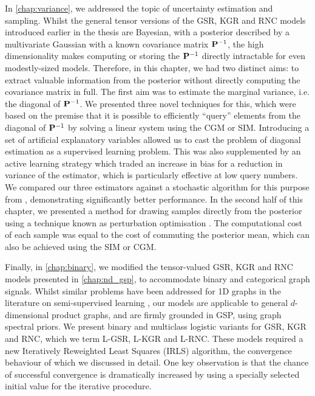 In \cref{chap:variance}, we addressed the topic of uncertainty estimation and sampling. Whilst the general tensor versions of the GSR, KGR and RNC models introduced earlier in the thesis are Bayesian, with a posterior described by a multivariate Gaussian with a known covariance matrix $\mathbf{P}^{-1}$, the high dimensionality makes computing or storing the $\mathbf{P}^{-1}$ directly intractable for even modestly-sized models. Therefore, in this chapter, we had two distinct aims: to extract valuable information from the posterior without directly computing the covariance matrix in full. The first aim was to estimate the marginal variance, i.e. the diagonal of $\mathbf{P}^{-1}$. We presented three novel techniques for this, which were based on the premise that it is possible to efficiently ``query'' elements from the diagonal of $\mathbf{P}^{-1}$ by solving a linear system using the CGM or SIM.  Introducing a set of artificial explanatory variables allowed us to cast the problem of diagonal estimation as a supervised learning problem. This was also supplemented by an active learning strategy which traded an increase in bias for a reduction in variance of the estimator, which is particularly effective at low query numbers. We compared our three estimators against a stochastic algorithm for this purpose from \cite{Bekas2007}, demonstrating significantly better performance. In the second half of this chapter, we presented a method for drawing samples directly from the posterior using a technique known as perturbation optimisation \citep{Orieux2012}. The computational cost of each sample was equal to the cost of commuting the posterior mean, which can also be achieved using the SIM or CGM. 

Finally, in \cref{chap:binary}, we modified the tensor-valued GSR, KGR and RNC models presented in \cref{chap:nd_gsp}, to accommodate binary and categorical graph signals. Whilst similar problems have been addressed for 1D graphs in the literature on semi-supervised learning \cite{Kondor2002,Zhu2003}, our models are applicable to general $d$-dimensional product graphs, and are firmly grounded in GSP, using graph spectral priors. We present binary and multiclass logistic variants for GSR, KGR and RNC, which we term L-GSR, L-KGR and L-RNC. These models required a new Iteratively Reweighted Least Squares (IRLS) algorithm, the convergence behaviour of which we discussed in detail. One key observation is that the chance of successful convergence is dramatically increased by using a specially selected initial value for the iterative procedure.  


